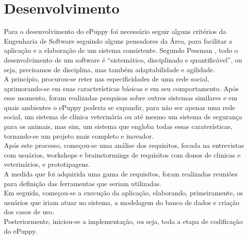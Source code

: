 \chapter{Desenvolvimento}

Para o desenvolvimento do ePuppy foi necessário seguir alguns critérios da Engenharia de Software seguindo alguns pensadores da Área, para facilitar a aplicação e a elaboração de um sistema consistente. Segundo Pessman \cite{Pressman2006}, todo o desenvolvimento de um software é “sistemático, disciplinado e quantificável”, ou seja, precisamos de disciplina, mas também adaptabilidade e agilidade. 
\\
\indent
A princípio, procurou-se reter nas especificidades de uma rede social, aprimorando-se em suas características básicas e em seu comportamento. Após esse momento, foram realizadas pesquisas sobre outros sistemas similares e em quais ambientes o ePuppy poderia se expandir, para não ser apenas uma rede social, um sistema de clínica veterinária ou até mesmo um sistema de segurança para os animais, mas sim, um sistema que engloba todas essas caraterísticas, tornando-se um projeto mais completo e inovador.
\\
\indent
Após este processo, começou-se uma análise dos requisitos, focada na entrevistas com usuários, workshops e brainstormings de requisitos com donos de clinicas e veterinários, e prototipagens. 
\\
\indent
A medida que foi adquirida uma gama de requisitos, foram realizadas reuniões para definição das ferramentas que seriam utilizadas.
\\
\indent
Em seguida, começou-se a execução da aplicação, elaborando, primeiramente, os usuários que iriam atuar no sistema, a modelagem do banco de dados e criação dos casos de uso. 
\\
\indent
Posteriormente, iniciou-se a implementação, ou seja, toda a etapa de codificação do ePuppy.


